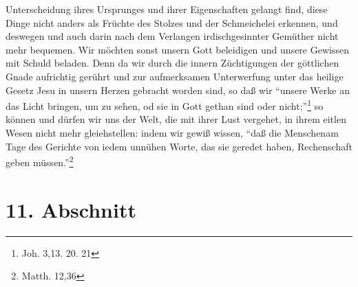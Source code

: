 Unterscheidung ihres Ursprunges und ihrer Eigenschaften gelangt find, diese Dinge nicht anders als Früchte des Stolzes und der Schmeichelei erkennen, und deswegen und auch darin nach dem Verlangen irdischgesinnter Gemüther nicht mehr bequemen. Wir möchten sonst unsern Gott beleidigen und unsere Gewissen mit Schuld beladen. Denn da wir durch die innern Züchtigungen der göttlichen Gnade aufrichtig gerührt und zur aufmerksamen Unterwerfung unter das heilige Gesetz Jesu in unsern Herzen gebracht worden sind, so daß wir "`unsere Werke an das Licht bringen, um zu sehen, od sie in Gott gethan sind oder nicht;"'\footnote{Joh. 3,13. 20. 21} so können und dürfen wir uns der Welt, die mit ihrer Lust vergehet, in ihrem eitlen Wesen nicht mehr gleiehstellen: indem wir gewiß wissen, "`daß die Menschenam Tage des Gerichte von iedem unnühen Worte, das sie geredet haben, Rechenschaft geben müssen."'\footnote{Matth. 12,36}

\section{11. Abschnitt}

